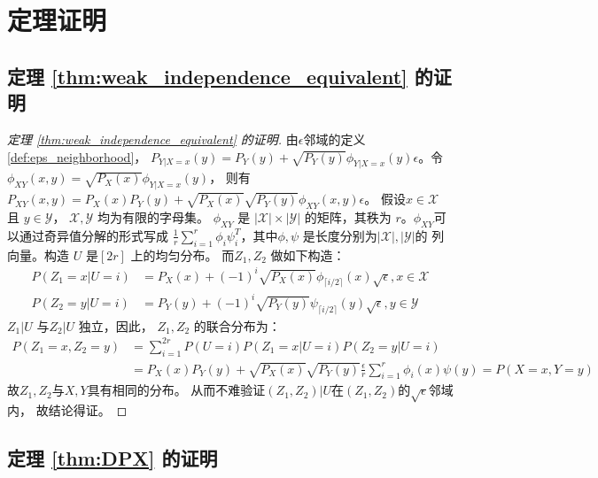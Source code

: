 
\section{定理证明}

\subsection{定理 \ref{thm:weak_independence_equivalent} 的证明}
\begin{proof}[定理 \ref{thm:weak_independence_equivalent} 的证明]
  由$\epsilon$邻域的定义 \ref{def:eps_neighborhood}，
  $P_{Y|X=x}(y) = P_Y(y) + \sqrt{P_Y(y)}\phi_{Y|X=x}(y)
  \epsilon$。令$\phi_{XY}(x,y)=\sqrt{P_X(x)}\phi_{Y|X=x}(y)$，
  则有
  $P_{XY}(x,y) = P_X(x)P_Y(y) + \sqrt{P_X(x)}\sqrt{P_Y(y)}\phi_{XY}(x,y)
  \epsilon$。
  假设$x\in \mathcal{X}$ 且 $y\in \mathcal{Y}$，
  $\mathcal{X}, \mathcal{Y}$ 均为有限的字母集。
  $\phi_{XY}$ 是 $|\mathcal{X}| \times |\mathcal{Y}|$
  的矩阵，其秩为 $r$。$\phi_{XY}$可以通过奇异值分解的形式写成
  $\frac{1}{r}\sum_{i=1}^r \phi_i \psi^T_i$，其中$\phi, \psi$
  是长度分别为$|\mathcal{X}|, |\mathcal{Y}|$的
  列向量。构造 $U$ 是$[2r]$ 上的均匀分布。
  而$Z_1, Z_2$ 做如下构造：
  \begin{align*}
    P(Z_1=x|U=i) &= P_X(x) + (-1)^i\sqrt{P_X(x)}\phi_{\lceil i/2 \rceil}(x) \sqrt{\epsilon}, x \in \mathcal{X} \\
    P(Z_2=y|U=i) &= P_Y(y) + (-1)^i\sqrt{P_Y(y)}\psi_{\lceil i/2 \rceil}(y) \sqrt{\epsilon}, y \in \mathcal{Y}
  \end{align*}
  $Z_1 | U$ 与$Z_2 | U$ 独立，因此，
  $Z_1, Z_2$ 的联合分布为：
  \begin{align*}
  P(Z_1=x, Z_2=y)& =\sum_{i=1}^{2r}P(U=i)P(Z_1=x|U=i)P(Z_2=y|U=i)\\
  &=P_X(x)P_Y(y) + \sqrt{P_X(x)}\sqrt{P_Y(y)}\frac{\epsilon}{r}
  \sum_{i=1}^{r}\phi_i(x)
  \psi(y) =P(X=x,Y=y)
  \end{align*}
  故$Z_1, Z_2$与$X,Y$具有相同的分布。
  从而不难验证$(Z_1, Z_2)|U$在$(Z_1, Z_2)$的$\sqrt{\epsilon}$邻域内，
  故结论得证。
  \end{proof}

\subsection{定理 \ref{thm:DPX} 的证明}

